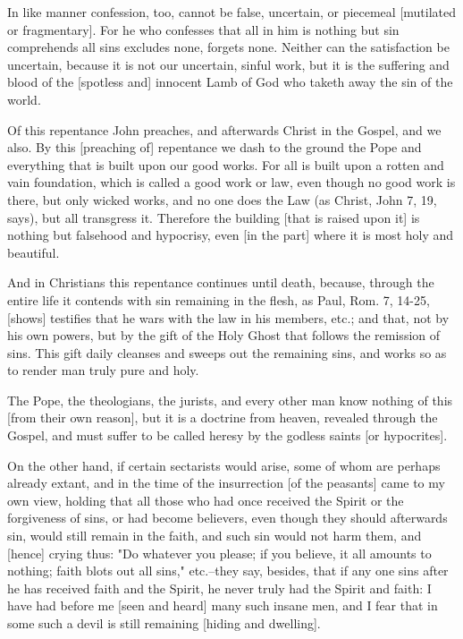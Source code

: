 In like manner confession, too, cannot be false, uncertain, or
piecemeal [mutilated or fragmentary]. For he who confesses
that all in him is nothing but sin comprehends all sins
excludes none, forgets none. Neither can the satisfaction be
uncertain, because it is not our uncertain, sinful work, but
it is the suffering and blood of the [spotless and] innocent
Lamb of God who taketh away the sin of the world.

Of this repentance John preaches, and afterwards Christ in the
Gospel, and we also. By this [preaching of] repentance we dash
to the ground the Pope and everything that is built upon our
good works. For all is built upon a rotten and vain
foundation, which is called a good work or law, even though no
good work is there, but only wicked works, and no one does the
Law (as Christ, John 7, 19, says), but all transgress it.
Therefore the building [that is raised upon it] is nothing but
falsehood and hypocrisy, even [in the part] where it is most
holy and beautiful.

And in Christians this repentance continues until death,
because, through the entire life it contends with sin
remaining in the flesh, as Paul, Rom. 7, 14-25, [shows]
testifies that he wars with the law in his members, etc.; and
that, not by his own powers, but by the gift of the Holy Ghost
that follows the remission of sins. This gift daily cleanses
and sweeps out the remaining sins, and works so as to render
man truly pure and holy.

The Pope, the theologians, the jurists, and every other man
know nothing of this [from their own reason], but it is a
doctrine from heaven, revealed through the Gospel, and must
suffer to be called heresy by the godless saints [or
hypocrites].

On the other hand, if certain sectarists would arise, some of
whom are perhaps already extant, and in the time of the
insurrection [of the peasants] came to my own view, holding
that all those who had once received the Spirit or the
forgiveness of sins, or had become believers, even though they
should afterwards sin, would still remain in the faith, and
such sin would not harm them, and [hence] crying thus: "Do
whatever you please; if you believe, it all amounts to
nothing; faith blots out all sins," etc.--they say, besides,
that if any one sins after he has received faith and the
Spirit, he never truly had the Spirit and faith: I have had
before me [seen and heard] many such insane men, and I fear
that in some such a devil is still remaining [hiding and
dwelling].


